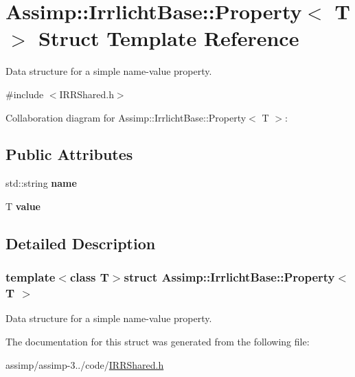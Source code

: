 \hypertarget{struct_assimp_1_1_irrlicht_base_1_1_property}{\section{Assimp\+:\+:Irrlicht\+Base\+:\+:Property$<$ T $>$ Struct Template Reference}
\label{struct_assimp_1_1_irrlicht_base_1_1_property}
}


Data structure for a simple name-\/value property.  




{\ttfamily \#include $<$I\+R\+R\+Shared.\+h$>$}



Collaboration diagram for Assimp\+:\+:Irrlicht\+Base\+:\+:Property$<$ T $>$\+:
\subsection*{Public Attributes}
\begin{DoxyCompactItemize}
\item 
\hypertarget{struct_assimp_1_1_irrlicht_base_1_1_property_a4dc4a364b146fad3a1837c6a705dfe95}{std\+::string {\bfseries name}}\label{struct_assimp_1_1_irrlicht_base_1_1_property_a4dc4a364b146fad3a1837c6a705dfe95}

\item 
\hypertarget{struct_assimp_1_1_irrlicht_base_1_1_property_a686a9613d4f7269cb92ddf96eacf5ea1}{T {\bfseries value}}\label{struct_assimp_1_1_irrlicht_base_1_1_property_a686a9613d4f7269cb92ddf96eacf5ea1}

\end{DoxyCompactItemize}


\subsection{Detailed Description}
\subsubsection*{template$<$class T$>$struct Assimp\+::\+Irrlicht\+Base\+::\+Property$<$ T $>$}

Data structure for a simple name-\/value property. 

The documentation for this struct was generated from the following file\+:\begin{DoxyCompactItemize}
\item 
assimp/assimp-\/3../code/\hyperlink{_i_r_r_shared_8h}{I\+R\+R\+Shared.\+h}\end{DoxyCompactItemize}
